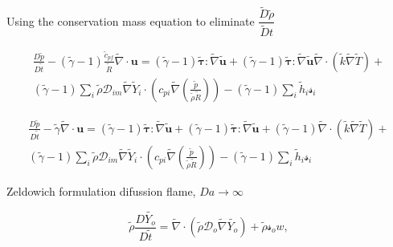 \documentclass[preprint,12pt,authoryear]{elsarticle}
\begin{document}
Using the conservation mass equation 
to eliminate $\dfrac{\tilde{D}\tilde{\rho}}{\tilde{D}t}$

\begin{equation}
\begin{split}
        \frac{D \tilde{p}}{D\tilde{t}}
	-
	(\tilde{\gamma}-1)
	\frac{\tilde{c}_{pf}}{\tilde{R}}
	\tilde{\nabla}\cdot{\mathbf{u}}
        =
	(\tilde{\gamma}-1)
        \pmb{\tilde{\tau}}:\tilde{\nabla} \tilde{\mathbf{u}} 
        + 
	(\tilde{\gamma}-1)
        \pmb{\tilde{\tau}}:\tilde{\nabla} \tilde{\mathbf{u}} 
        \tilde{\nabla} \cdot (\tilde{k}\tilde{\nabla} \tilde{T})
        +
	\\
	(\tilde{\gamma}-1)
        \sum\limits_i 
        \tilde{\rho}
        \mathcal{D}_{im}
        \tilde{\nabla}
        \tilde{Y}_i     
        \cdot
        \left(
                c_{pi}
                \tilde{\nabla}
                \left(
                	\frac{\tilde{p}}{\tilde{\rho}\tilde{R}}
                \right)
        \right)
	-
	(\tilde{\gamma}-1)
        \sum\limits_i
        \tilde{h}_i
        \mathcal{s}_i	
\end{split}
\end{equation}

\begin{equation}
\begin{split}
        \frac{D \tilde{p}}{D\tilde{t}}
	-
	\tilde{\gamma}
	\tilde{\nabla}\cdot{\mathbf{u}}
        =
	(\tilde{\gamma}-1)
        \pmb{\tilde{\tau}}:\tilde{\nabla} \tilde{\mathbf{u}} 
        + 
	(\tilde{\gamma}-1)
        \pmb{\tilde{\tau}}:\tilde{\nabla} \tilde{\mathbf{u}} 
        + 
	(\tilde{\gamma}-1)
        \tilde{\nabla} \cdot (\tilde{k}\tilde{\nabla} \tilde{T})
        +
	\\
	(\tilde{\gamma}-1)
        \sum\limits_i 
        \tilde{\rho}
        \mathcal{D}_{im}
        \tilde{\nabla}
        \tilde{Y}_i     
        \cdot
        \left(
                c_{pi}
                \tilde{\nabla}
                \left(
                	\frac{\tilde{p}}{\tilde{\rho}\tilde{R}}
                \right)
        \right)
	-
	(\tilde{\gamma}-1)
        \sum\limits_i
        \tilde{h}_i
        \mathcal{s}_i	
\end{split}
\end{equation}


Zeldowich formulation difussion flame, $Da\to \infty$

\begin{equation}
	\tilde{\rho} \frac{D  \tilde{Y_o}}{D \tilde{t}}
= 
	\tilde{\nabla}\cdot( \tilde{\rho} \mathcal{D}_o\tilde{\nabla} \tilde{Y_o})
	+
        \tilde{\rho}\mathcal{s}_ow	
 ,
\end{equation}
\end{document}
